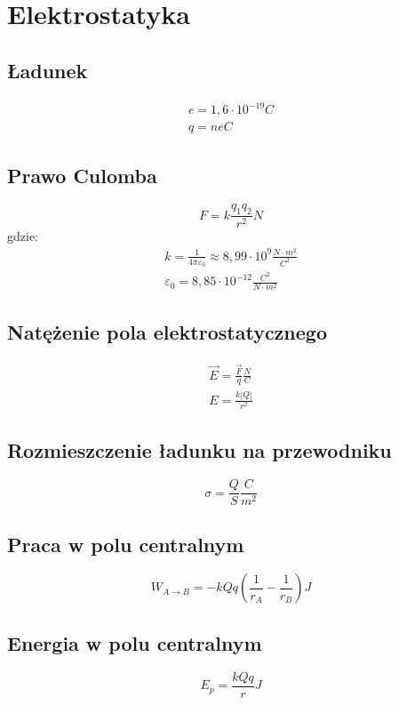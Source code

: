 \chapter{Elektrostatyka}
  \section{Ładunek}
    \begin{gather}
      e = 1,6\cdot 10^{-19} \unit{C}\\
      q = ne \unit{C}
    \end{gather}
  \section{Prawo Culomba}
    \begin{equation}
      F = k\frac{q_1q_2}{r^2} \unit{N}
    \end{equation}
    gdzie:
    \begin{gather}
      k = \frac{1}{4\pi\varepsilon_0} \approx 8,99\cdot 10^9 \unit{\frac{N\cdot m^2}{C^2}}\\
      \varepsilon_0 = 8,85\cdot 10^{-12} \unit{\frac{C^2}{N\cdot m^2}}
    \end{gather}
  \section{Natężenie pola elektrostatycznego}
    \begin{gather}
      \vec E = \frac{\vec F}{q} \unit{\frac{N}{C}}\\
      E = \frac{k|Q|}{r^2}
    \end{gather}
  \section{Rozmieszczenie ładunku na przewodniku}
    \begin{equation}
      \sigma = \frac{Q}{S} \unit{\frac{C}{m^2}}
    \end{equation}
  \section{Praca w polu centralnym}
    \begin{equation}
      W_{A\rightarrow B} = -kQq\left(\frac{1}{r_A} - \frac{1}{r_B}\right) \unit{J}
    \end{equation}
  \section{Energia w polu centralnym}
    \begin{equation}
      E_p = \frac{kQq}{r} \unit{J}
    \end{equation}
